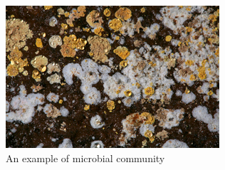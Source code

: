 \documentclass[draft, final]{report}
\begin{document}
\begin{figure}[!ht]
    \begin{minipage}[c]{.46\linewidth}
        \centering
        \includegraphics[scale=0.7]{LateX/Images/microbialcommunity.png}
        \caption{An example of microbial community\cite{microbialcommunities}}
    \end{minipage}
\end{figure}

\clearpage
\end{document}
